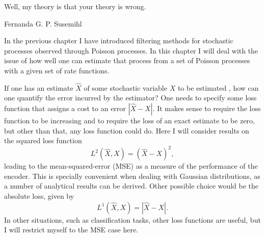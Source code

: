 \epigraph{Well, my theory is that your theory is wrong.}{Fernanda G. P. Susemihl}

In the previous chapter I have introduced filtering methods for stochastic processes observed through Poisson processes. In this chapter I will deal with the issue of how well one
can estimate that process from a set of Poisson processes with a given set of rate functions.\par

If one has an estimate $\hat{X}$ of some stochastic variable $X$ to be estimated , how
can one quantify the error incurred by the estimator? One needs to specify some loss function that assigns a cost to an error $|\hat{X}-X|$. It makes sense to require the loss function to
be increasing and to require the loss of an exact estimate to be zero, but other than that, any loss function could do. Here I will consider results on the squared loss function
\[
L^2(\hat{X},X) = (\hat{X}-X)^2,
\]
leading to the mean-squared-error (MSE) as a measure of the performance of the encoder. This is specially convenient when dealing with Gaussian distributions, as a number of 
analytical  results can be derived. Other possible choice would be the absolute loss, given by
\[
L^1(\hat{X},X) = |\hat{X}-X|.
\]
In other situations, such as classification tasks, other loss functions are useful, but I will restrict myself to the MSE case here.\par

